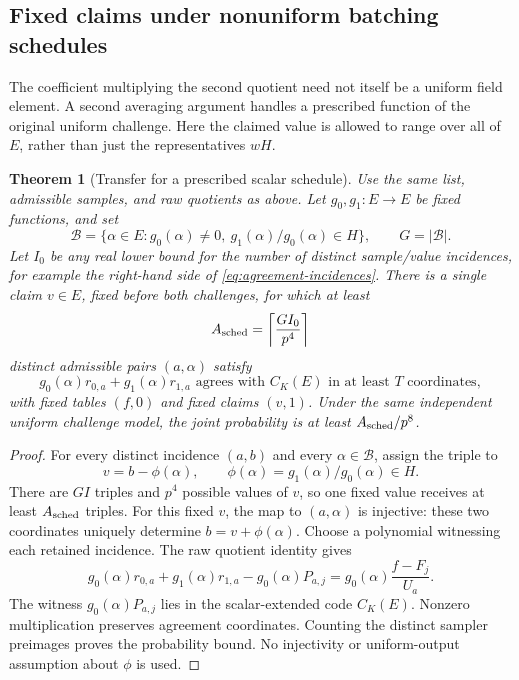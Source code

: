 \documentclass[11pt,letterpaper]{article}
\newtheorem{theorem}{Theorem}[section]
\theoremstyle{definition}
\theoremstyle{remark}
\begin{document}
\subsection{Fixed claims under nonuniform batching schedules}
\label{sec:scheduled-transfer}

The coefficient multiplying the second quotient need not itself be a
uniform field element. A second averaging argument handles a prescribed
function of the original uniform challenge. Here the claimed value is
allowed to range over all of $E$, rather than just the representatives
$wH$.

\begin{theorem}[Transfer for a prescribed scalar schedule]
\label{thm:scheduled-transfer}
Use the same list, admissible samples, and raw quotients as above.
Let $g_0,g_1:E\to E$ be fixed functions, and set
\[
 \mathcal B=\{\alpha\in E:g_0(\alpha)\ne0,
                  \ g_1(\alpha)/g_0(\alpha)\in H\},
 \qquad G=|\mathcal B|.
\]
Let $I_0$ be any real lower bound for the number of distinct
sample/value incidences, for example the right-hand side of
\eqref{eq:agreement-incidences}. There is a single claim $v\in E$,
fixed before both challenges, for which at least
\[
 A_{\rm sched}=\left\lceil\frac{G I_0}{p^4}\right\rceil
\]
distinct admissible pairs $(a,\alpha)$ satisfy
\[
 g_0(\alpha)r_{0,a}+g_1(\alpha)r_{1,a}
 \text{ agrees with }C_K(E)\text{ in at least }T\text{ coordinates},
\]
with fixed tables $(f,0)$ and fixed claims $(v,1)$.
Under the same independent uniform challenge model, the joint
probability is at least $A_{\rm sched}/p^8$.
\end{theorem}
\begin{proof}
For every distinct incidence $(a,b)$ and every $\alpha\in\mathcal B$,
assign the triple to
\[
 v=b-\phi(\alpha),\qquad
 \phi(\alpha)=g_1(\alpha)/g_0(\alpha)\in H.
\]
There are $GI$ triples and $p^4$ possible values of $v$, so one fixed
value receives at least $A_{\rm sched}$ triples. For this fixed $v$,
the map to $(a,\alpha)$ is injective: these two coordinates uniquely
determine $b=v+\phi(\alpha)$. Choose a polynomial witnessing each
retained incidence. The raw quotient identity gives
\[
 g_0(\alpha)r_{0,a}+g_1(\alpha)r_{1,a}
       -g_0(\alpha)P_{a,j}
 =g_0(\alpha)\frac{f-F_j}{U_a}.
\]
The witness $g_0(\alpha)P_{a,j}$ lies in the scalar-extended code
$C_K(E)$. Nonzero multiplication preserves agreement coordinates.
Counting the distinct sampler preimages proves the probability bound.
No injectivity or uniform-output assumption about $\phi$ is used.
\end{proof}
\end{document}
